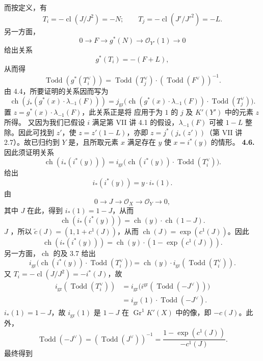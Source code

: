 而按定义，有
\[T_i=-\operatorname{cl}(J/J^2)=-N;\qquad T_j=-\operatorname{cl}(J'/J'^2)=-L.\]
另一方面，
\[0\longrightarrow F\longrightarrow g^*(N)\longrightarrow\mathscr O_{Y'}(1)\longrightarrow0\]
给出关系
\[g^*(T_i)=-(F+L),\]
从而得
\[\operatorname{Todd}(g^*(T_i^\vee))=\operatorname{Todd}(T_j^\vee)\cdot(\operatorname{Todd}(F^\vee))^{-1}.\]
由 4.4，所要证明的关系因而写为
\[\operatorname{ch}(j_*(g^*(x)\cdot\lambda_{-1}(F)))=j_{\mathrm{gr}}\bigl(\operatorname{ch}(g^*(x)\cdot\lambda_{-1}(F))\cdot\operatorname{Todd}(T_j^\vee)\bigr).\]
置 $z=g^*(x)\cdot\lambda_{-1}(F)$，此关系正是将 应用于为 $1$ 的 $j$ 及 $K'(Y')$ 中的元素 $z$ 所得。
又因为我们已假设 $i$ 满足第 VII 讲 4.1 的假设，$\lambda_{-1}(F)$ 可被 $1-L$ 整除。因此可找到 $z'$，使 $z=z'(1-L)$，亦即 $z=j^*(j_*(z'))$（第 VII 讲 2.7）。故已归约到 $Y$ 是，且所取元素 $x$ 满足存在 $y$ 使 $x=i^*(y)$ 的情形。
\textbf{4.6.} 因此须证明关系
\[\operatorname{ch}(i_*(i^*(y)))=i_{\mathrm{gr}}\bigl(\operatorname{ch}(i^*(y))\cdot\operatorname{Todd}(T_i^\vee)\bigr).\]
给出
\[i_*(i^*(y))=y\cdot i_*(1).\]
由
\[0\longrightarrow J\longrightarrow\mathscr O_X\longrightarrow\mathscr O_Y\longrightarrow0,\]
其中 $J$ 在此，得到 $i_*(1)=1-J$，从而
\[\operatorname{ch}(i_*(i^*(y)))=\operatorname{ch}(y)\cdot\operatorname{ch}(1-J).\]
$J$ ，所以 $\widetilde c(J)=(1,1+c^1(J))$，从而 $\operatorname{ch}(J)=\exp(c^1(J))$。因此
\[\operatorname{ch}(i_*(i^*(y)))=\operatorname{ch}(y)\cdot(1-\exp(c^1(J))).\]
另一方面，$\operatorname{ch}$ 的及 3.7 给出
\[i_{\mathrm{gr}}\bigl(\operatorname{ch}(i^*(y))\cdot\operatorname{Todd}(T_i^\vee)\bigr)=\operatorname{ch}(y)\cdot i_{\mathrm{gr}}(\operatorname{Todd}(T_i^\vee)).\]
又 $T_i=-\operatorname{cl}(J/J^2)=-i^*(J)$，故
\[\begin{aligned}
i_{\mathrm{gr}}(\operatorname{Todd}(T_i^\vee))
&=i_{\mathrm{gr}}\bigl(i^{\mathrm{gr}}(\operatorname{Todd}(-J^\vee))\bigr)\\
&=i_{\mathrm{gr}}(1)\cdot\operatorname{Todd}(-J^\vee).
\end{aligned}\]
$i_*(1)=1-J$，故 $i_{\mathrm{gr}}(1)$ 是 $1-J$ 在 $\operatorname{Gr}^1K'(X)$ 中的像，即 $-c(J)$。此外，
\[\operatorname{Todd}(-J^\vee)=(\operatorname{Todd}(J^\vee))^{-1}=\frac{1-\exp(c^1(J))}{-c^1(J)}.\]
最终得到
